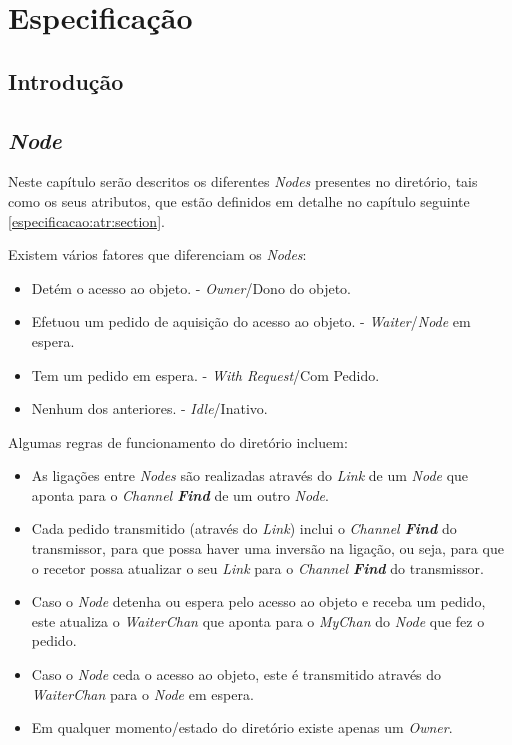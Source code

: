 \chapter{Especificação}
\label{chap:especificacao}

\section{Introdução}
\label{especificacao:sec:intro}
\section{\emph{Node}}
Neste capítulo serão descritos os diferentes \emph{Nodes} presentes no diretório, tais como os seus atributos, 
que estão definidos em detalhe no capítulo seguinte \ref{especificacao:atr:section}.

Existem vários fatores que diferenciam os \emph{Nodes}: 
\begin{itemize}
    \item Detém o acesso ao objeto. - \emph{Owner}/Dono do objeto.
    \item Efetuou um pedido de aquisição do acesso ao objeto. - \emph{Waiter}/\emph{Node} em espera.
    \item Tem um pedido em espera. - \emph{With Request}/Com Pedido.
    \item Nenhum dos anteriores. - \emph{Idle}/Inativo.
\end{itemize}



Algumas regras de funcionamento do diretório incluem:

\begin{itemize}
    \item As ligações entre \emph{Nodes} são realizadas através do \emph{Link} de um \emph{Node}
    que aponta para o \emph{Channel \textbf{Find}} de um outro \emph{Node}.
    \item Cada pedido transmitido (através do \emph{Link}) inclui o \emph{Channel \textbf{Find}} do transmissor,   
    para que possa haver uma inversão na ligação, ou seja, para que o recetor possa atualizar 
    o seu \emph{Link} para o \emph{Channel \textbf{Find}} do transmissor.
    \item Caso o \emph{Node} detenha ou espera pelo acesso ao objeto e receba um pedido,
    este atualiza o \emph{WaiterChan} que aponta para o \emph{MyChan} do \emph{Node} que fez o pedido.
    \item Caso o \emph{Node} ceda o acesso ao objeto, este é transmitido através do \emph{WaiterChan} para o \emph{Node} em espera.
    \item Em qualquer momento/estado do diretório existe apenas um \emph{Owner}.
\end{itemize}



